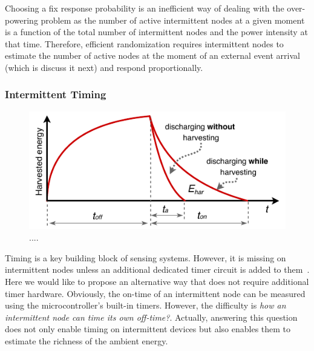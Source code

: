 Choosing a fix response probability is an inefficient way of dealing with the over-powering problem as the number of active intermittent nodes at a given moment is a function of the total number of intermittent nodes and the power intensity at that time. Therefore, efficient randomization requires intermittent nodes to estimate the number of active nodes at the moment of an external event arrival (which is discuss it next) and respond proportionally.


\subsubsection{Intermittent Timing}
\label{subsec:interTimer}
%
\begin{figure}[t]
		\centering
		\includegraphics[width=\columnwidth]{figures/softwareClock}
		\caption{....}
		\label{fig:softwareClock}
\end{figure} 
%

Timing is a key building block of sensing systems. However, it is missing on intermittent nodes unless an additional dedicated timer circuit is added to them~\cite{hester2017timely}. Here we would like to propose an alternative way that does not require additional timer hardware. Obviously, the on-time of an intermittent node can be measured using the microcontroller's built-in timers. However, the difficulty is \textit{how an intermittent node can time its own off-time?}. Actually, answering this question does not only enable timing on intermittent devices but also enables them to estimate the richness of the ambient energy. 
%
